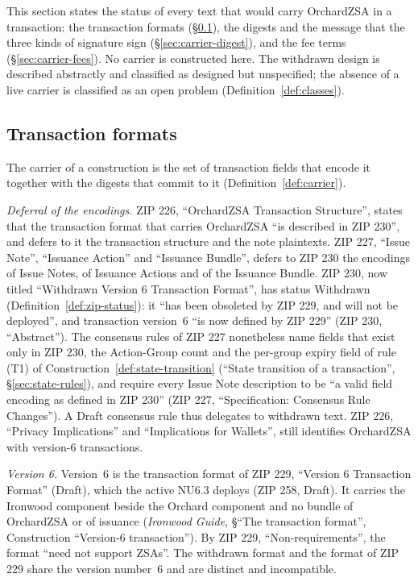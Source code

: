\documentclass[11pt,a4paper]{article}
\theoremstyle{definition}
\begin{document}
This section states the status of every text that would carry OrchardZSA in
a transaction: the transaction formats (\S\ref{sec:carrier-format}), the
digests and the message that the three kinds of signature sign
(\S\ref{sec:carrier-digest}), and the fee terms (\S\ref{sec:carrier-fees}).
No carrier is constructed here. The withdrawn design is described
abstractly and classified as designed but unspecified; the absence of a
live carrier is classified as an open problem
(Definition~\ref{def:classes}).

\subsection{Transaction formats}\label{sec:carrier-format}

The carrier of a construction is the set of transaction fields that encode
it together with the digests that commit to it
(Definition~\ref{def:carrier}).

\emph{Deferral of the encodings.} ZIP 226, ``OrchardZSA Transaction
Structure'', states that the transaction format that carries OrchardZSA
``is described in ZIP 230'', and defers to it the transaction structure and
the note plaintexts. ZIP 227, ``Issue Note'', ``Issuance Action'' and
``Issuance Bundle'', defers to ZIP 230 the encodings of Issue Notes, of
Issuance Actions and of the Issuance Bundle. ZIP 230, now titled
``Withdrawn Version 6 Transaction Format'', has status Withdrawn
(Definition~\ref{def:zip-status}): it ``has been obsoleted by ZIP 229, and
will not be deployed'', and transaction version~$6$ ``is now defined by ZIP
229'' (ZIP 230, ``Abstract''). The consensus rules of ZIP 227 nonetheless
name fields that exist only in ZIP 230, the Action-Group count and the
per-group expiry field of rule (T1) of Construction~\ref{def:state-transition}
(``State transition of a transaction'', \S\ref{sec:state-rules}), and
require every Issue Note description to be ``a valid field encoding as
defined in ZIP 230'' (ZIP 227, ``Specification: Consensus Rule Changes'').
A Draft consensus rule thus delegates to withdrawn text. ZIP 226,
``Privacy Implications'' and ``Implications for Wallets'', still identifies
OrchardZSA with version-$6$ transactions.

\emph{Version 6.} Version~$6$ is the transaction format of ZIP 229,
``Version 6 Transaction Format'' (Draft), which the active NU6.3 deploys
(ZIP 258, Draft). It carries the Ironwood component beside
the Orchard component and no bundle of OrchardZSA or of issuance
(\emph{Ironwood Guide}, \S``The transaction format'', Construction
``Version-6 transaction''). By ZIP 229, ``Non-requirements'', the format
``need not support ZSAs''. The withdrawn format and the format of
ZIP 229 share the version number~$6$ and are distinct and incompatible.
\end{document}
